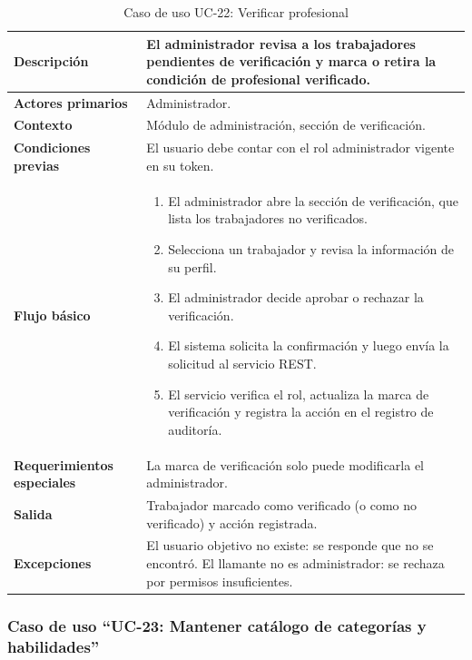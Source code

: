 \documentclass[doc,12pt,a4paper]{apa7}
\begin{document}
\begin{longtable}{|P{3.3cm}|L{11.2cm}|}
\caption{Caso de uso UC-22: Verificar profesional}\\
\hline
\textbf{Descripción} & El administrador revisa a los trabajadores pendientes de verificación y marca o retira la condición de profesional verificado. \\ \hline
\textbf{Actores primarios} & Administrador. \\ \hline
\textbf{Contexto} & Módulo de administración, sección de verificación. \\ \hline
\textbf{Condiciones previas} & El usuario debe contar con el rol administrador vigente en su token. \\ \hline
\textbf{Flujo básico} &
\begin{enumerate}
    \item El administrador abre la sección de verificación, que lista los trabajadores no verificados.
    \item Selecciona un trabajador y revisa la información de su perfil.
    \item El administrador decide aprobar o rechazar la verificación.
    \item El sistema solicita la confirmación y luego envía la solicitud al servicio REST.
    \item El servicio verifica el rol, actualiza la marca de verificación y registra la acción en el registro de auditoría.
\end{enumerate} \\ \hline
\textbf{Requerimientos especiales} & La marca de verificación solo puede modificarla el administrador. \\ \hline
\textbf{Salida} & Trabajador marcado como verificado (o como no verificado) y acción registrada. \\ \hline
\textbf{Excepciones} & El usuario objetivo no existe: se responde que no se encontró. El llamante no es administrador: se rechaza por permisos insuficientes. \\ \hline
\end{longtable}

\subsubsection{Caso de uso ``UC-23: Mantener catálogo de categorías y habilidades''}
\end{document}
